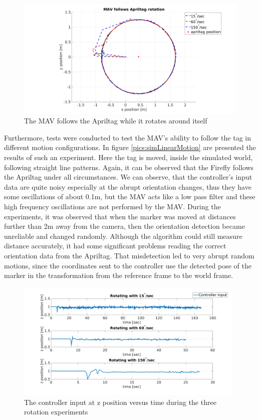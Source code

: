 \begin{figure}
   \centering
   \includegraphics[width=1.00\textwidth]{images/MAV_controller_input_rotation_tracking.pdf}
   \caption{The MAV follows the Apriltag while it rotates around itself}
   \label{pics:xyRotation}
\end{figure}

Furthermore, tests were conducted to test the MAV's ability to follow the tag in different motion configurations. In figure \ref{pics:simLinearMotion} are presented the results of such an experiment. Here the tag is moved, inside the simulated world, following straight line patterns. Again, it can be observed that the Firefly follows the Apriltag under all circumstances. We can observe, that the controller's input data are quite noisy especially at the abrupt orientation changes, thus they have some oscillations of about 0.1m, but the MAV acts like a low pass filter and these high frequency oscillations are not performed by the MAV. During the experiments, it was observed that when the marker was moved at distances further than 2m away from the camera, then the orientation detection became unreliable and changed randomly. Although the algorithm could still measure distance accurately, it had some significant problems reading the correct orientation data from the Apriltag. That misdetection led to very abrupt random motions, since the coordinates sent to the controller use the detected pose of the marker in the transformation from the reference frame to the world frame. 

\begin{figure}
   \centering
   \includegraphics[width=0.98\textwidth]{images/sim_z_axis_during_rotation.pdf}
   \caption{The controller input at z position versus time during the three rotation experiments}
   \label{pics:zRotationCOntroller}
\end{figure}

